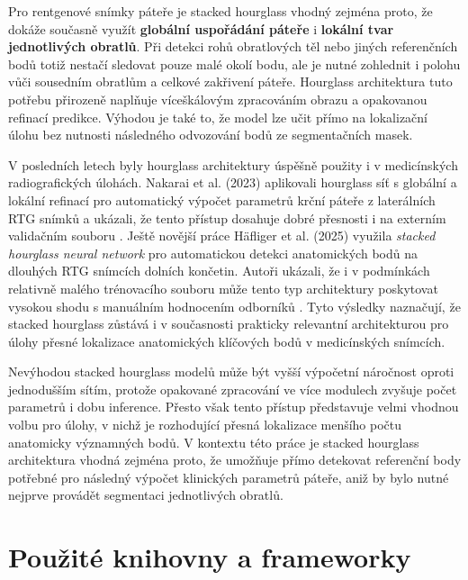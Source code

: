 \documentclass[male,czech,api_bc]{kitheses}
\begin{document}
Pro rentgenové snímky páteře je stacked hourglass vhodný zejména proto, že dokáže současně využít \textbf{globální uspořádání páteře} i \textbf{lokální tvar jednotlivých obratlů}. Při detekci rohů obratlových těl nebo jiných referenčních bodů totiž nestačí sledovat pouze malé okolí bodu, ale je nutné zohlednit i polohu vůči sousedním obratlům a celkové zakřivení páteře. Hourglass architektura tuto potřebu přirozeně naplňuje víceškálovým zpracováním obrazu a opakovanou refinací predikce. Výhodou je také to, že model lze učit přímo na lokalizační úlohu bez nutnosti následného odvozování bodů ze segmentačních masek.

V posledních letech byly hourglass architektury úspěšně použity i v medicínských radiografických úlohách. Nakarai et al. (2023) aplikovali hourglass síť s globální a lokální refinací pro automatický výpočet parametrů krční páteře z laterálních RTG snímků a ukázali, že tento přístup dosahuje dobré přesnosti i na externím validačním souboru \cite{Nakarai2023}. Ještě novější práce Häfliger et al. (2025) využila \textit{stacked hourglass neural network} pro automatickou detekci anatomických bodů na dlouhých RTG snímcích dolních končetin. Autoři ukázali, že i v podmínkách relativně malého trénovacího souboru může tento typ architektury poskytovat vysokou shodu s manuálním hodnocením odborníků \cite{Hafliger2025}. Tyto výsledky naznačují, že stacked hourglass zůstává i v současnosti prakticky relevantní architekturou pro úlohy přesné lokalizace anatomických klíčových bodů v medicínských snímcích.

Nevýhodou stacked hourglass modelů může být vyšší výpočetní náročnost oproti jednodušším sítím, protože opakované zpracování ve více modulech zvyšuje počet parametrů i dobu inference. Přesto však tento přístup představuje velmi vhodnou volbu pro úlohy, v nichž je rozhodující přesná lokalizace menšího počtu anatomicky významných bodů. V kontextu této práce je stacked hourglass architektura vhodná zejména proto, že umožňuje přímo detekovat referenční body potřebné pro následný výpočet klinických parametrů páteře, aniž by bylo nutné nejprve provádět segmentaci jednotlivých obratlů.

\chapter{Použité knihovny a frameworky}
\label{sec:libraries}
\end{document}
